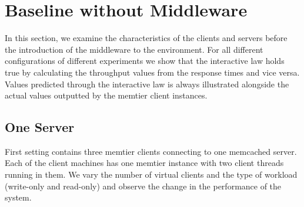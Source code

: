 \documentclass[11pt,a4paper]{article}
\begin{document}
\section{Baseline without Middleware} \label{sec:csb}
In this section, we examine the characteristics of the clients and servers before the introduction of the middleware to the environment. For all different configurations of different experiments we show that the interactive law holds true by calculating the throughput values from the response times and vice versa. Values predicted through the interactive law is always illustrated alongside the actual values outputted by the memtier client instances.

\subsection{One Server} \label{sec:csb1}
First setting contains three memtier clients connecting to one memcached server. Each of the client machines has one memtier instance with two client threads running in them. We vary the number of virtual clients and the type of workload (write-only and read-only) and observe the change in the performance of the system.
\end{document}
